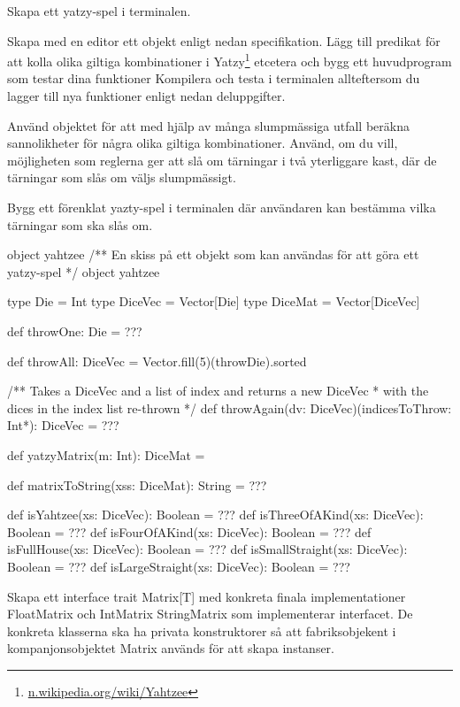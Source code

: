 \Subtask 

\ExtraTasks %

\Task Skapa ett yatzy-spel i terminalen.

\Subtask Skapa med en editor ett objekt enligt nedan specifikation. Lägg till predikat för att kolla olika giltiga kombinationer i Yatzy\footnote{\href{https://en.wikipedia.org/wiki/Yahtzee}{n.wikipedia.org/wiki/Yahtzee}} etcetera och bygg ett huvudprogram som testar dina funktioner Kompilera och testa i terminalen allteftersom du lagger till nya funktioner enligt nedan deluppgifter.

\Subtask Använd objektet för att med hjälp av många slumpmässiga utfall beräkna sannolikheter för några olika giltiga kombinationer. Använd, om du vill, möjligheten som reglerna ger att slå om tärningar i två yterliggare kast, där de tärningar som slås om väljs slumpmässigt.

\Subtask Bygg ett förenklat yazty-spel i terminalen där användaren kan bestämma vilka tärningar som ska slås om.

\begin{ScalaSpec}{object yahtzee}
/** En skiss på ett objekt som kan användas för att göra ett yatzy-spel */
object yahtzee {
  type Die = Int
  type DiceVec = Vector[Die]
  type DiceMat = Vector[DiceVec]

  def throwOne: Die = ???
  
  def throwAll: DiceVec = Vector.fill(5)(throwDie).sorted

  /** Takes a DiceVec and a list of index and returns a new DiceVec 
    * with the dices in the index list re-thrown */
  def throwAgain(dv: DiceVec)(indicesToThrow: Int*): DiceVec = ???

  def yatzyMatrix(m: Int): DiceMat = 
  
  def matrixToString(xss: DiceMat): String = ???
  
  def isYahtzee(xs: DiceVec): Boolean = ???
  def isThreeOfAKind(xs: DiceVec): Boolean = ???
  def isFourOfAKind(xs: DiceVec): Boolean = ???
  def isFullHouse(xs: DiceVec): Boolean = ???
  def isSmallStraight(xs: DiceVec): Boolean = ???
  def isLargeStraight(xs: DiceVec): Boolean = ???
}
\end{ScalaSpec}


\AdvancedTasks %

\Task Skapa ett interface trait Matrix[T] med konkreta finala implementationer FloatMatrix och IntMatrix StringMatrix som implementerar interfacet. De konkreta klasserna ska ha privata konstruktorer så att fabriksobjekent i kompanjonsobjektet Matrix används för att skapa instanser.
    